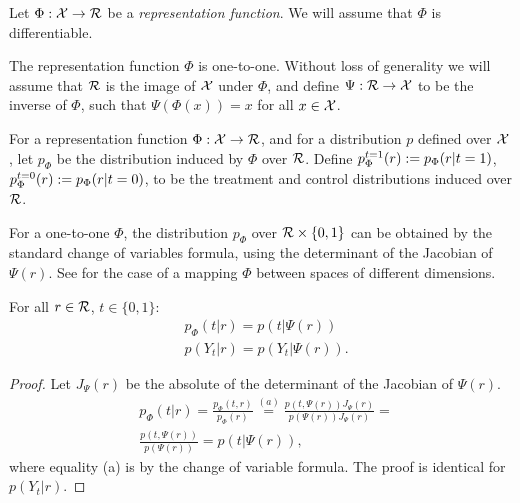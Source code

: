 Let $\Phi : \mathcal X \rightarrow \mathcal{R}$ be a \emph{representation function}. We will assume that $\Phi$ is differentiable.

\begin{thmappasmp}\label{asmp:invA}
The representation function $\Phi $ is one-to-one. Without loss of generality we will assume that $\mathcal{R}$ is the image of $\mathcal X$ under $\Phi$, and define $\Psi :\mathcal{R} \rightarrow \mathcal X$ to be the inverse of $\Phi$, such that $\Psi(\Phi(x)) = x$ for all $x \in \mathcal X$.
\end{thmappasmp}

\begin{thmappdef}\label{def:pphiA}
For a representation function $\Phi :\mathcal X \rightarrow \mathcal{R}$, and for a distribution $p$ defined over $\mathcal X$, let $p_\Phi$ be the distribution induced by $\Phi$ over $\mathcal{R}$. Define $p^{t=1}_\Phi(r) := p_\Phi(r|t=1)$, $p^{t=0}_\Phi(r) := p_\Phi(r|t=0)$, to be the treatment and control distributions induced over $\mathcal{R}$.
\end{thmappdef}


For a one-to-one $\Phi$, the distribution $p_\Phi$ over $\mathcal{R} \times \{0,1\}$ can be obtained by the standard change of variables formula, using the determinant of the Jacobian of $\Psi(r)$. See \cite{ben1999change} for the case of a mapping $\Phi$ between spaces of different dimensions.


\begin{thmapplem}\label{lemma:smpl_alg3}
For all $r \in \mathcal{R}$, $t \in \{0,1\}$:
\begin{align*}
&p_\Phi(t|r) = p(t|\Psi(r))\\
& p(Y_t|r) = p(Y_t|\Psi(r)).
\end{align*}
\end{thmapplem}
\begin{proof}
Let $J_\Psi(r)$ be the absolute of the determinant of the Jacobian of $\Psi(r)$.
\begin{align*}
&p_\Phi(t|r) = \frac{p_\Phi(t,r)}{p_\Phi(r)}  \stackrel{(a)}{=}
\frac{p(t,\Psi(r))J_\Psi(r)}{p(\Psi(r)) J_\Psi(r)} = \\
&\frac{p(t,\Psi(r))}{p(\Psi(r))} = p(t|\Psi(r)),
\end{align*}
where equality (a) is by the change of variable formula. The proof is identical for $p(Y_t|r)$.
\end{proof}

